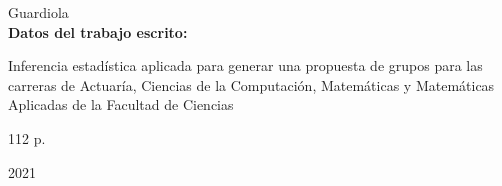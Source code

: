 {Guardiola\\

\textbf{Datos del trabajo escrito:}

Inferencia estadística aplicada para generar una propuesta de grupos para las carreras de Actuaría, Ciencias de la Computación, Matemáticas y Matemáticas Aplicadas de la Facultad de Ciencias

112 p.

2021
}%








%
 

\newpage %
\thispagestyle{empty} %

\tableofcontents %

